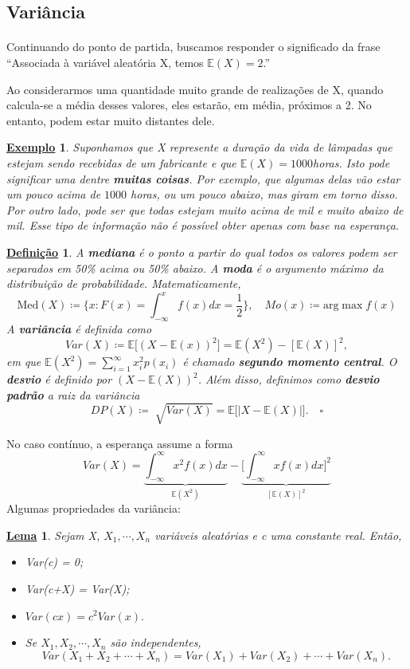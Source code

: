 \documentclass{article}
\newtheorem*{def*}{\underline{Defini\c c\~ao}}
\newtheorem*{lemma*}{\underline{Lema}}
\newtheorem{example}{\underline{Exemplo}}
\begin{document}
\subsection{Variância}
\paragraph{} Continuando do ponto de partida, buscamos responder o significado da frase ``Associada à variável
aleatória X, temos \(\mathbb{E}(X) = 2\).''

Ao considerarmos uma quantidade muito grande de realizações de X, quando calcula-se a média desses valores,
eles estarão, em média, próximos a 2. No entanto, podem estar muito distantes dele.
\begin{example}
  Suponhamos que X represente a duração da vida de lâmpadas que estejam sendo recebidas de um fabricante e que \(\mathbb{E}(X) = 1000\)horas.
  Isto pode significar uma dentre \textbf{muitas coisas}. Por exemplo, que algumas delas vão estar um pouco acima de \(1000\) horas,
  ou um pouco abaixo, mas giram em torno disso. Por outro lado, pode ser que todas estejam muito acima de mil e muito abaixo de mil.
  Esse tipo de informação não é possível obter apenas com base na esperança.
\end{example}
\begin{def*}
  A \textbf{mediana} é o ponto a partir do qual todos os valores podem ser separados em 50\% acima ou 50\% abaixo. A \textbf{moda} é
  o argumento máximo da distribuição de probabilidade. Matematicamente, 
  \[
    \text{Med}(X) \coloneqq \biggl\{x: F(x) = \int_{-\infty}^{x}f(x)dx = \frac{1}{2}\biggr\} ,\quad Mo(x) \coloneqq \text{arg}\max{f(x)}
  \]
  A \textbf{variância} é definida como 
  \[
    Var(X)\coloneqq \mathbb{E}\biggl[(X-\mathbb{E}(x))^{2}\biggr] = \mathbb{E}(X^{2}) - [\mathbb{E}(X)]^{2},
  \]
  em que \(\mathbb{E}(X^{2}) = \sum\limits_{i=1}^{\infty}x_{i}^{2}p(x_{i})\) é chamado \textbf{segundo momento central}.
  O \textbf{desvio} é definido por \((X-\mathbb{E}(X))^{2}\). Além disso, definimos como \textbf{desvio padrão} a 
  raiz da variância 
  \[
    DP(X) \coloneqq  \sqrt[]{Var(X)} = \mathbb{E}\biggl[|X-\mathbb{E}(X)|\biggr].\quad\square
  \]
\end{def*}
No caso contínuo, a esperança assume a forma 
\[
  Var(X) = \underbrace{\int_{-\infty}^{\infty}x^{2}f(x)dx}_{\mathbb{E}(X^{2})} - \underbrace{\biggl[\int_{-\infty}^{\infty}xf(x)dx\biggr]^{2}}_{[\mathbb{E}(X)]^{2}}
\]
Algumas propriedades da variância: 
\begin{lemma*}
  Sejam X, \(X_{1}, \cdots, X_{n}\) variáveis aleatórias e c uma constante real. Então, 
  \begin{itemize}
    \item[a)] Var(c) = 0;
    \item[b)] Var(c+X) = Var(X);
    \item[c)] \(Var(cx) =c^{2}Var(x).\)
    \item[d)] Se \(X_{1}, X_{2}, \cdots, X_{n}\) são independentes, 
      \[
        Var(X_{1}+X_{2}+\cdots+X_{n}) = Var(X_{1})+Var(X_{2})+\cdots+Var(X_{n}).
      \]
  \end{itemize}
\end{lemma*}
\end{document}
